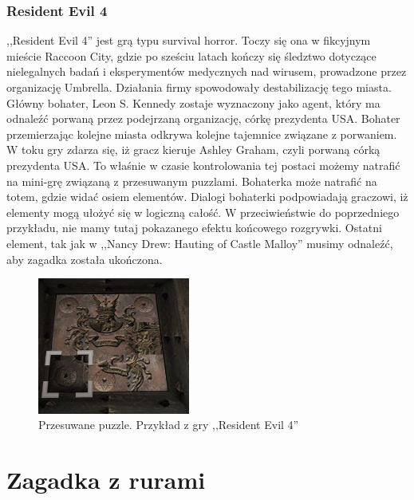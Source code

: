 \documentclass[oneside,polski,logo]{amuthesis}
\begin{document}
\subsubsection{Resident Evil 4}
\par ,,Resident Evil 4'' jest grą typu survival horror. Toczy się ona w fikcyjnym mieście Raccoon City, gdzie po sześciu latach kończy się śledztwo dotyczące nielegalnych badań i eksperymentów medycznych nad wirusem, prowadzone przez organizację Umbrella. Działania firmy spowodowały destabilizację tego miasta. Główny bohater, Leon S. Kennedy zostaje wyznaczony jako agent, który ma odnaleźć porwaną przez podejrzaną organizację, córkę prezydenta USA. Bohater przemierzając kolejne miasta odkrywa kolejne tajemnice związane z porwaniem. W toku gry zdarza się, iż gracz kieruje Ashley Graham, czyli porwaną córką prezydenta USA. To właśnie w czasie kontrolowania tej postaci możemy natrafić na mini-grę związaną z przesuwanym puzzlami. Bohaterka może natrafić na totem, gdzie widać osiem elementów. Dialogi bohaterki podpowiadają graczowi, iż elementy mogą ułożyć się w logiczną całość. W przeciwieństwie do poprzedniego przykładu, nie mamy tutaj pokazanego efektu końcowego rozgrywki. Ostatni element, tak jak w ,,Nancy Drew: Hauting of Castle Malloy'' musimy odnaleźć, aby zagadka została ukończona.

\begin{figure}[h]
	\centering
	\includegraphics[width=5cm]{images/tyrek/re4.png}
	\caption{Przesuwane puzzle. Przykład z gry ,,Resident Evil 4''}
\end{figure}


\section{Zagadka z rurami}
\end{document}
